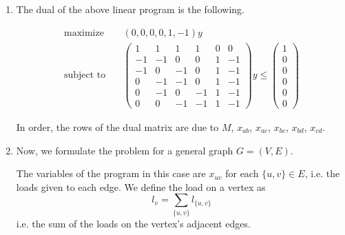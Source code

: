 \documentclass[letterpaper,11pt]{article}
\begin{document}
\begin{enumerate}
\begin{enumerate}
            \item The dual of the above linear program is the following.

                \begin{align*}
                    \text{maximize} \quad
                        & (0, 0, 0, 0, 1, -1) y \\
                    \text{subject to} \quad &
                    \left(
                        \begin{array}{cccccc}
                            1  & 1  & 1  & 1  & 0 & 0 \\
                            -1 & -1 & 0  & 0  & 1 & -1 \\
                            -1 & 0  & -1 & 0  & 1 & -1 \\
                            0  & -1 & -1 & 0  & 1 & -1 \\
                            0  & -1 & 0  & -1 & 1 & -1 \\
                            0  & 0  & -1 & -1 & 1 & -1
                        \end{array}
                    \right)
                    y
                    \leq
                    \left(
                        \begin{array}{c}
                            1 \\
                            0 \\
                            0 \\
                            0 \\
                            0 \\
                            0
                        \end{array}
                    \right)
                \end{align*}

                In order, the rows of the dual matrix are due to $M$, $x_{ab}$,
                $x_{ac}$, $x_{bc}$, $x_{bd}$, $x_{cd}$.

            \item Now, we formulate the problem for a general graph
                $G = (V, E)$.

                The variables of the program in this case are $x_{uv}$
                for each $\{u, v\} \in E$, i.e. the loads given to each edge.
                We define the load on a vertex as
                $$
                l_v = \sum_{\{u, v\}} {l_{\{u, v\}}}
                $$
                i.e. the sum of the loads on the vertex's adjacent edges.


\end{enumerate}
\end{enumerate}
\end{document}
